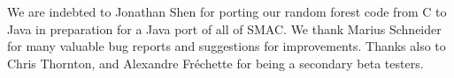\documentclass[11pt,letterpaper,oneside]{article}
\begin{document}
We are indebted to Jonathan Shen for porting our random forest code from C to Java in preparation for a Java port of all of SMAC. We thank Marius Schneider for many valuable bug reports and suggestions for improvements. Thanks also to Chris Thornton, and Alexandre Fr\'echette for being a secondary beta testers.


\renewcommand{\bibsection}{\section{References}}


\end{document}
